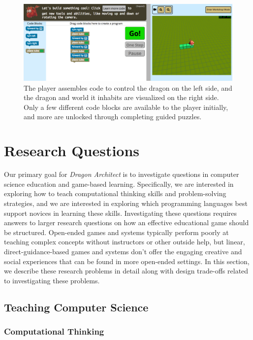 \documentclass{sig-alternate}
\newcommand{\gametitle}{{\emph{Dragon Architect}}}
\begin{document}
\begin{figure}[t!]
  \centering
  \includegraphics[width=\textwidth]{images/overall-example}
  \caption{The player assembles code to control the dragon on the left side, and the dragon and world it inhabits are visualized on the right side. Only a few different code blocks are available to the player initially, and more are unlocked through completing guided puzzles.}
  \label{fig:overall}
\end{figure}

\section{Research Questions}
\label{sec:research}

Our primary goal for \gametitle{} is to investigate questions in computer science education and game-based learning. 
Specifically, we are interested in exploring how to teach computational thinking skills and problem-solving strategies, and we are interested in exploring which programming languages best support novices in learning these skills. 
Investigating these questions requires answers to larger research questions on how an effective educational game should be structured.
Open-ended games and systems typically perform poorly at teaching complex concepts without instructors or other outside help, but linear, direct-guidance-based games and systems don't offer the engaging creative and social experiences that can be found in more open-ended settings.
In this section, we describe these research problems in detail along with design trade-offs related to investigating these problems.

\subsection{Teaching Computer Science}

\subsubsection{Computational Thinking}
\end{document}
